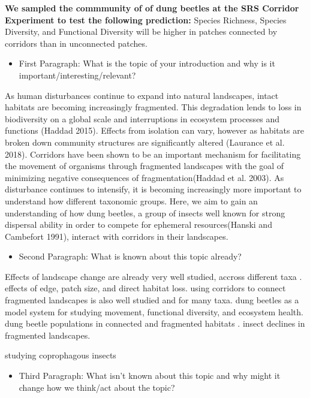 \documentclass[
]{article}
\providecommand{\tightlist}{%
  \setlength{\itemsep}{0pt}\setlength{\parskip}{0pt}}
\begin{document}
\textbf{We sampled the commmunity of of dung beetles at the SRS Corridor
Experiment to test the following prediction:} Species Richness, Species
Diversity, and Functional Diversity will be higher in patches connected
by corridors than in unconnected patches.

\begin{itemize}
\tightlist
\item
  First Paragraph: What is the topic of your introduction and why is it
  important/interesting/relevant?
\end{itemize}

As human disturbances continue to expand into natural landscapes, intact
habitats are becoming increasingly fragmented. This degradation lends to
loss in biodiversity on a global scale and interruptions in ecosystem
processes and functions (Haddad 2015). Effects from isolation can vary,
however as habitats are broken down community structures are
significantly altered (Laurance et al. 2018). Corridors have been shown
to be an important mechanism for facilitating the movement of organisms
through fragmented landscapes with the goal of minimizing negative
consequences of fragmentation(Haddad et al. 2003). As disturbance
continues to intensify, it is becoming increasingly more important to
understand how different taxonomic groups. Here, we aim to gain an
understanding of how dung beetles, a group of insects well known for
strong dispersal ability in order to compete for ephemeral
resources(Hanski and Cambefort 1991), interact with corridors in their
landscapes.

\begin{itemize}
\tightlist
\item
  Second Paragraph: What is known about this topic already?
\end{itemize}

Effects of landscape change are already very well studied, accross
different taxa . effects of edge, patch size, and direct habitat loss.
using corridors to connect fragmented landscapes is also well studied
and for many taxa. dung beetles as a model system for studying movement,
functional diversity, and ecosystem health. dung beetle populations in
connected and fragmented habitats . insect declines in fragmented
landscapes.

studying coprophagous insects

\begin{itemize}
\tightlist
\item
  Third Paragraph: What isn't known about this topic and why might it
  change how we think/act about the topic?
\end{itemize}
\end{document}
